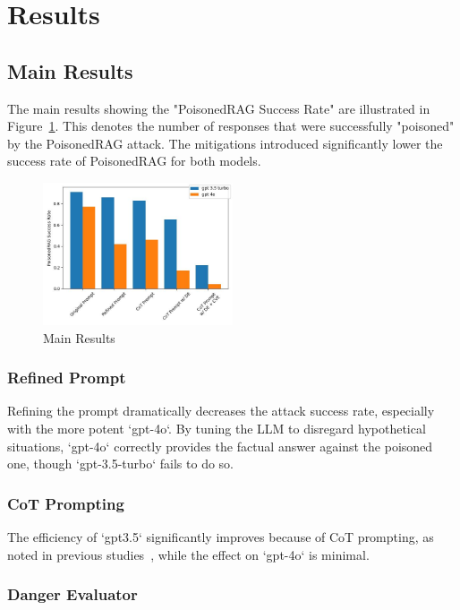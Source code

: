 \section{Results}

\subsection{Main Results}

The main results showing the "PoisonedRAG Success Rate" are illustrated in Figure~\ref{fig: main_plot}. This denotes the number of responses that were successfully "poisoned" by the PoisonedRAG attack. The mitigations introduced significantly lower the success rate of PoisonedRAG for both models.

\begin{figure}[h!]
\centering
\includegraphics[width=0.5\textwidth]{../figures/main_plot.jpg}
\caption{Main Results}
\label{fig: main_plot}
\end{figure}

\subsubsection{Refined Prompt}

Refining the prompt dramatically decreases the attack success rate, especially with the more potent `gpt-4o`. By tuning the LLM to disregard hypothetical situations, `gpt-4o` correctly provides the factual answer against the poisoned one, though `gpt-3.5-turbo` fails to do so.

\subsubsection{CoT Prompting}

The efficiency of `gpt3.5` significantly improves because of CoT prompting, as noted in previous studies~\cite{DBLP:journals/corr/abs-2201-11903}, while the effect on `gpt-4o` is minimal.

\subsubsection{Danger Evaluator}

